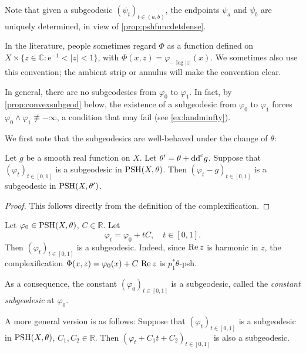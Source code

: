 \begin{remark}
    Note that given a subgeodesic $(\psi_t)_{t\in (a,b)}$, the endpoints $\psi_a$ and $\psi_b$ are uniquely determined, in view of \cref{prop:pshfuncdetdense}.
\end{remark}

\begin{remark}\label{rmk:complexify1}
In the literature, people sometimes regard $\Phi$ as a function defined on $X\times\{z\in \mathbb{C}: \mathrm{e}^{-1}<|z|<1\}$, with $\Phi(x,z)=\varphi_{-\log |z|}(x)$. We sometimes also use this convention; the ambient strip or annulus will make the convention clear.
\end{remark}



In general, there are no subgeodesics from $\varphi_0$ to $\varphi_1$. In fact, by \cref{prop:convexsubgeod} below, the existence of a subgeodesic from $\varphi_0$ to $\varphi_1$ forces $\varphi_0\land\varphi_1\not\equiv-\infty$, a condition that may fail (see \cref{ex:landminfty}).

We first note that the subgeodesics are well-behaved under the change of $\theta$:
\begin{proposition}\label{prop:subgeodindeptheta}
    Let $g$ be a smooth real function on $X$.
    Let $\theta'=\theta+\mathrm{dd}^{\mathrm{c}} g$. Suppose that $(\varphi_t)_{t\in [0,1]}$ is a subgeodesic in $\mathrm{PSH}(X,\theta)$. Then $(\varphi_t-g)_{t\in [0,1]}$ is a subgeodesic in $\mathrm{PSH}(X,\theta')$.
\end{proposition}
\begin{proof}
    This follows directly from the definition of the complexification.
\end{proof}

\begin{example}\label{ex:linearsubgeod}
    Let $\varphi_0\in \mathrm{PSH}(X,\theta)$, $C\in \mathbb{R}$. Let
    \[
    \varphi_t=\varphi_0+tC,\quad t\in [0,1].
    \]
    Then $(\varphi_t)_{t\in [0,1]}$ is a subgeodesic.
    Indeed, since $\operatorname{Re} z$ is harmonic in $z$, the complexification $\Phi(x,z)=\varphi_0(x)+C\,\operatorname{Re} z$ is $p_1^*\theta$-psh.

    As a consequence, the constant $(\varphi_0)_{t\in [0,1]}$ is a subgeodesic, called the \emph{constant subgeodesic} at $\varphi_0$.

    A more general version is as follows: Suppose that $(\varphi_t)_{t\in [0,1]}$ is a subgeodesic in $\mathrm{PSH}(X,\theta)$, $C_1,C_2\in \mathbb{R}$. Then $(\varphi_t+C_1t+C_2)_{t\in [0,1]}$ is also a subgeodesic.
\end{example}


